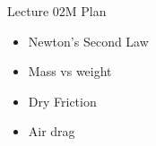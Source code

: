 \documentclass[english]{beamer}
\begin{document}
\begin{frame}{Lecture 02M Plan}
  \begin{itemize}
    \item Newton's Second Law
    \item Mass vs weight
    \item Dry Friction
    \item Air drag
  \end{itemize}
\end{frame}
\end{document}
